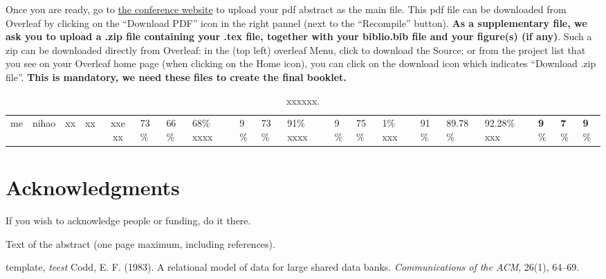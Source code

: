 \documentclass[a4paper, 10pt]{article}
\begin{document}
Once you are ready, go to \href{https://cln2025.sciencesconf.org/}{the conference website} to upload your pdf abstract as the main file. This pdf file can be downloaded from Overleaf by clicking on the ``Download PDF'' icon in the right pannel (next to the ``Recompile'' button). \textbf{As a supplementary file, we ask you to upload a .zip file containing your .tex file, together with your biblio.bib file and your figure(s) (if any)}. Such a zip can be downloaded directly from Overleaf: in the (top left) overleaf Menu, click to download the Source; or from the project list that you see on your Overleaf home page (when clicking on the Home icon), you can click on the download icon which indicates ``Download .zip file''. \textbf{\textcolor{Firebrick1}{This is mandatory, we need these files to create the final booklet.}}




\begin{table}[!htp] \footnotesize
	\centering
	\fontsize{6.5}{8}\selectfont
	\begin{threeparttable}
		\caption{xxxxxx.}
		\label{1234567}
		\setlength{\tabcolsep}{15mm}
		\begin{tabular}{ccccccc}
			\toprule
			\multirow{2}{*}{me} &
			\multicolumn{3}{c}{nihao}\cr
			\cmidrule(lr){2-4}
			                    & xx         & xx         & xxe\cr
			\midrule
			xx                  & 73$\%$     & 66$\%$     & 68$\%$\cr
			xxxx                & 9$\%$      & 73$\%$     & 91$\%$\cr
			xxxx                & 9$\%$      & 75$\%$     & 1$\%$\cr
			xxx                 & 91$\%$     & 89.78$\%$  & 92.28$\%$\cr
			xxx                 & {\bf9$\%$} & {\bf7$\%$} & {\bf9$\%$}\cr
			\bottomrule
		\end{tabular}
	\end{threeparttable}
\end{table}
















\section*{Acknowledgments}
If you wish to acknowledge people or funding, do it there.

\printbibliography
Text of the abstract (one page maximum, including references).

\begin{thebibliography}{60}
	template,
	\textit{teest}
	 Codd, E. F. (1983). A relational model of data for large shared data banks. \textit{Communications of the ACM}, 26(1), 64--69.

\end{thebibliography}
\end{document}
